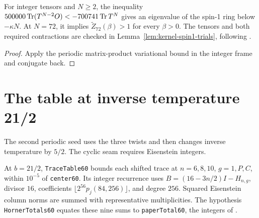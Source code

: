 \begin{lemma}
  \label{lem:spin1-trial-bridge}
  \leanok
  For integer tensors and \(N\ge2\), the inequality
  \(500000\operatorname{Tr}(T^{N-2}O)<-700741\operatorname{Tr} T^N\) gives an eigenvalue of the spin-1 ring below
  \(-\kappa N\).
  At \(N=72\), it implies \(\widetilde Z_{72}(\beta)>1\) for every \(\beta>0\).
  The tensors and both required contractions are checked in
  Lemma~\ref{lem:kernel-spin1-trials}, following \cite[Appendix C]{OpenAIHaldane}.
\end{lemma}
\begin{proof}
  \leanok
  Apply the periodic matrix-product variational bound in the integer frame and conjugate back.
\end{proof}

\section{The table at inverse temperature 21/2}

The second periodic seed uses the three twists and then changes inverse temperature by \(5/2\).
The cyclic seam requires Eisenstein integers.

\begin{definition}
  \label{def:spin1-horner60}
  \leanok
  At \(b=21/2\), \texttt{TraceTable60} bounds each shifted trace at \(n=6,8,10\),
  \(g=1,P,C\), within \(10^{-5}\) of \texttt{center60}.
  Its integer recurrence uses \(B=(16-3n/2)I-H_{n,g}\), divisor \(16\),
  coefficients \(\lfloor2^{56}p_j(84,256)\rfloor\), and degree \(256\).
  Squared Eisenstein column norms are summed with representative multiplicities.
  The hypothesis \texttt{HornerTotals60} equates these nine sums to \texttt{paperTotal60},
  the integers of \cite[Appendix A.4]{OpenAIHaldane}.
\end{definition}

